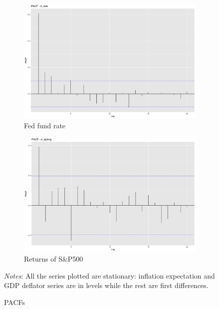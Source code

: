 \documentclass[hidelinks,12pts]{article}
\DeclareMathOperator{\1}{\mathbbm{1}}
\begin{document}
\begin{figure}[h!]
\begin{subfigure}[b]{0.45\textwidth}
        \includegraphics[width=\textwidth]{IMAGES/pacf_rate.png}
        \caption*{Fed fund rate}
    \end{subfigure}
    \hfill
    \begin{subfigure}[b]{0.45\textwidth}
        \centering
        \includegraphics[width=\textwidth]{IMAGES/pacf_sp.png}
        \caption*{Returns of S\&P500}
    \end{subfigure}
    \hfill 
    \caption{PACFs}
    \label{fig:pacf_all}
    \begin{minipage}{0.9\textwidth}
        \small{\emph{Notes}: All the series plotted are stationary: inflation expectation and GDP deflator series are in levels while the rest are first differences.}
    \end{minipage}
\end{figure}
\end{document}
